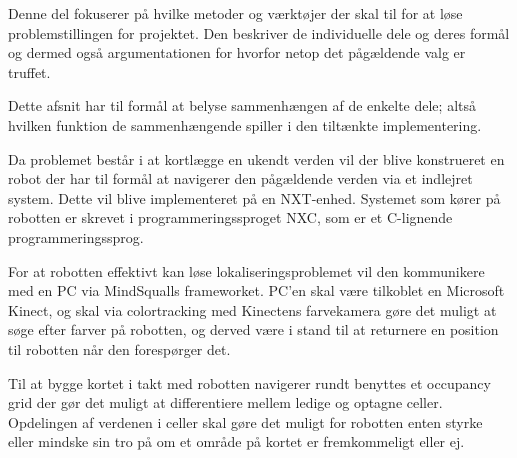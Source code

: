 Denne del fokuserer på hvilke metoder og værktøjer der skal til for at løse problemstillingen for projektet.
Den beskriver de individuelle dele og deres formål og dermed også argumentationen for hvorfor netop det pågældende valg er truffet.

Dette afsnit har til formål at belyse sammenhængen af de enkelte dele; altså hvilken funktion de sammenhængende spiller i den tiltænkte implementering.

Da problemet består i at kortlægge en ukendt verden vil der blive konstrueret en robot der har til formål at navigerer den pågældende verden via et indlejret system.
Dette vil blive implementeret på en NXT-enhed.
Systemet som kører på robotten er skrevet i programmeringssproget NXC, som er et C-lignende programmeringssprog.

For at robotten effektivt kan løse lokaliseringsproblemet vil den kommunikere med en PC via MindSqualls frameworket.
PC'en skal være tilkoblet en Microsoft Kinect, og skal via colortracking med Kinectens farvekamera gøre det muligt at søge efter farver på robotten, og derved være i stand til at returnere en position til robotten når den forespørger det.

Til at bygge kortet i takt med robotten navigerer rundt benyttes et occupancy grid der gør det muligt at differentiere mellem ledige og optagne celler.
Opdelingen af verdenen i celler skal gøre det muligt for robotten enten styrke eller mindske sin tro på om et område på kortet er fremkommeligt eller ej.